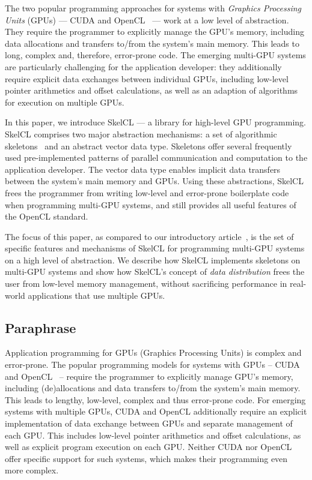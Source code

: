 The two popular programming approaches for systems with \emph{Graphics Processing Units} (GPUs) --- CUDA and OpenCL~\cite{OpenCL,CUDAProgrammingGuide,KirkHw2010} --- work at a low level of abstraction.
They require the programmer to explicitly manage the GPU's memory, including data allocations and transfers to/from the system's main memory.
This leads to long, complex and, therefore, error-prone code.
The emerging multi-GPU systems are particularly challenging for the application developer:
they additionally require explicit data exchanges between individual GPUs, including low-level pointer arithmetics and offset calculations, as well as an adaption of algorithms for execution on multiple GPUs.

In this paper, we introduce SkelCL --- a library for high-level GPU programming.
SkelCL comprises two major abstraction mechanisms: a set of algorithmic skeletons~\cite{Cole1991} and an abstract vector data type.
Skeletons offer several frequently used pre-implemented patterns of parallel communication and computation to the application developer.
The vector data type enables implicit data transfers between the system's main memory and GPUs.
Using these abstractions, SkelCL frees the programmer from writing low-level and error-prone boilerplate code when programming multi-GPU systems, and still provides all useful features of the OpenCL standard.

The focus of this paper, as compared to our introductory article~\cite{SteuwerKeGo2011}, is the set of specific features and mechanisms of SkelCL for programming multi-GPU systems on a high level of abstraction.
We describe how SkelCL implements skeletons on multi-GPU systems and show how SkelCL's concept of \emph{data distribution} frees the user from low-level memory management, without sacrificing performance in real-world applications that use multiple GPUs.


\subsection{Paraphrase}
Application programming for GPUs (Graphics Processing Units) is complex and error-prone.
The popular programming models for systems with GPUs -- CUDA and OpenCL~\cite{CUDAProgrammingGuide,KirkHw2010,OpenCL} -- require the programmer to explicitly manage GPU's memory, including (de)allocations and data transfers to/from the system's main memory.
This leads to lengthy, low-level, complex and thus error-prone code.
For emerging systems with multiple GPUs, CUDA and OpenCL additionally require an explicit implementation of data exchange between GPUs and separate management of each GPU.
This includes low-level pointer arithmetics and offset calculations, as well as explicit program execution on each GPU.
Neither CUDA nor OpenCL offer specific support for such systems, which makes their programming even more complex.

